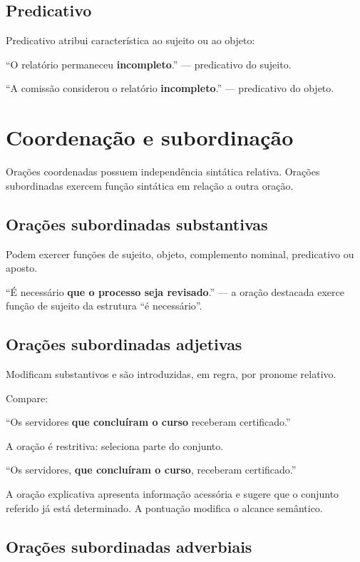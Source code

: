\subsection{Predicativo}

Predicativo atribui característica ao sujeito ou ao objeto:

``O relatório permaneceu \textbf{incompleto}.'' — predicativo do sujeito.

``A comissão considerou o relatório \textbf{incompleto}.'' — predicativo do objeto.

\section{Coordenação e subordinação}

Orações coordenadas possuem independência sintática relativa. Orações subordinadas exercem função sintática em relação a outra oração.

\subsection{Orações subordinadas substantivas}

Podem exercer funções de sujeito, objeto, complemento nominal, predicativo ou aposto.

``É necessário \textbf{que o processo seja revisado}.'' — a oração destacada exerce função de sujeito da estrutura ``é necessário''.

\subsection{Orações subordinadas adjetivas}

Modificam substantivos e são introduzidas, em regra, por pronome relativo.

Compare:

``Os servidores \textbf{que concluíram o curso} receberam certificado.''

A oração é restritiva: seleciona parte do conjunto.

``Os servidores, \textbf{que concluíram o curso}, receberam certificado.''

A oração explicativa apresenta informação acessória e sugere que o conjunto referido já está determinado. A pontuação modifica o alcance semântico.

\subsection{Orações subordinadas adverbiais}

